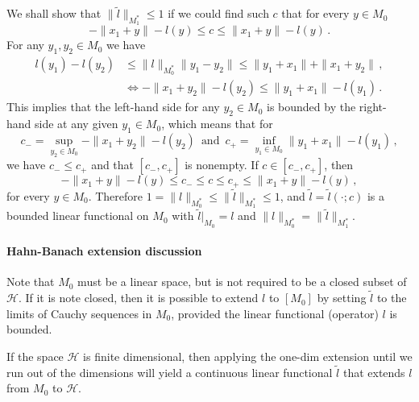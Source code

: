 \documentclass[a4paper]{article}
\newcommand{\Hcal}{\mathcal{H}}
\begin{document}
We shall show that $\|\tilde{l}\|_{M_1^*} \leq 1$ if we could find such $c$ that for
every $y \in M_0$
\begin{equation*}
  - \|x_1 + y\| - l(y) \leq c \leq \|x_1 + y\| - l(y)
    \,.
\end{equation*}
For any $y_1, y_2 \in M_0$ we have
\begin{align*}
  l(y_1) - l(y_2)
    &\leq \|l\|_{M_0^*} \|y_1 - y_2\|
    \leq \|y_1 + x_1 \| + \|x_1 + y_2\|
    \,, \\
  &\Leftrightarrow
  - \|x_1 + y_2\| - l(y_2)
    \leq \|y_1 + x_1 \| - l(y_1)
    \,.
\end{align*}
This implies that the left-hand side for any $y_2\in M_0$ is bounded by the right-%
hand side at any given $y_1\in M_0$, which means that for
\begin{equation*}
  c_-
    = \sup_{y_2\in M_0} - \|x_1 + y_2\| - l(y_2)
    \,\text{ and }\,
    c_+ = \inf_{y_1\in M_0} \|y_1 + x_1 \| - l(y_1)
    \,,
\end{equation*}
we have $c_- \leq c_+$ and that $[c_-, c_+]$ is nonempty. If $c\in [c_-, c_+]$, then
\begin{equation*}
  - \|x_1 + y\| - l(y) \leq c_- \leq c \leq c_+ \leq \|x_1 + y\| - l(y)
    \,,
\end{equation*}
for every $y \in M_0$. Therefore $1 = \|l\|_{M_0^*} \leq \|\tilde{l}\|_{M_1^*} \leq 1$, 
and $\tilde{l} = \tilde{l}(\cdot; c)$ is a bounded linear functional on $M_0$ with
$\tilde{l}\big\vert_{M_0} = l$ and $\|l\|_{M_0^*}=\|\tilde{l}\|_{M_1^*}$.


\paragraph{Hahn-Banach extension discussion} %
\label{par:hahn_banach_extension_discussion}

Note that $M_0$ must be a linear space, but is not required to be a closed subset
of $\Hcal$. If it is note closed, then it is possible to extend $l$ to $[M_0]$ by
setting $\tilde{l}$ to the limits of Cauchy sequences in $M_0$, provided the linear
functional (operator) $l$ is bounded.

If the space $\Hcal$ is finite dimensional, then applying the one-dim extension
until we run out of the dimensions will yield a continuous linear functional $\tilde{l}$
that extends $l$ from $M_0$ to $\Hcal$.
\end{document}
